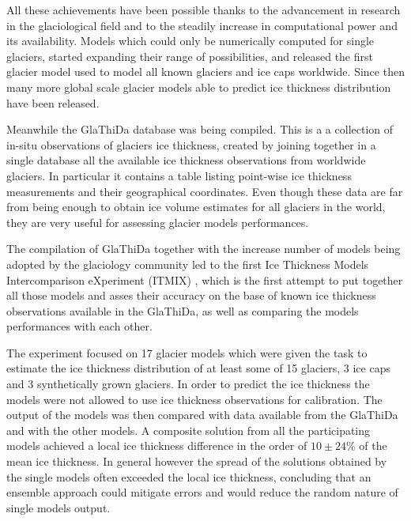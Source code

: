 All these achievements have been possible thanks to the advancement in research in the glaciological field and to the steadily increase in computational power and its availability. Models which could only be numerically computed for single glaciers, started expanding their range of possibilities, and \citet{Huss2012} released the first glacier model used to model all known glaciers and ice caps worldwide. Since then many more global scale glacier models able to predict ice thickness distribution have been released. 

Meanwhile the GlaThiDa database was being compiled. This is a a collection of in-situ observations of glaciers ice thickness, created by joining together in a single database all the available ice thickness observations from worldwide glaciers. In particular it contains a table listing point-wise ice thickness measurements and their geographical coordinates. Even though these data are far from being enough to obtain ice volume estimates for all glaciers in the world, they are very useful for assessing glacier models performances. 

The compilation of GlaThiDa together with the increase number of models being adopted by the glaciology community led to the first Ice Thickness Models Intercomparison eXperiment (ITMIX) \citep{Farinotti2017}, which is the first attempt to put together all those models and asses their accuracy on the base of known ice thickness observations available in the GlaThiDa, as well as comparing the models performances with each other. 

The experiment focused on 17 glacier models which were given the task to estimate the ice thickness distribution of at least some of 15 glaciers, 3 ice caps and 3 synthetically grown glaciers. In order to predict the ice thickness the models were not allowed to use ice thickness observations for calibration. The output of the models was then compared with data available from the GlaThiDa and with the other models. A composite solution from all the participating models achieved a local ice thickness difference in the order of $10 \pm 24\%$ of the mean ice thickness. In general however the spread of the solutions obtained by the single models often exceeded the local ice thickness, concluding that an ensemble approach could mitigate errors and would reduce the random nature of single models output.  

